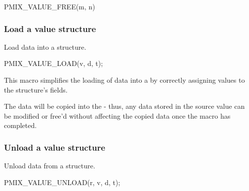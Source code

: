 \cspecificstart
\begin{codepar}
PMIX_VALUE_FREE(m, n)
\end{codepar}
\cspecificend

\begin{arglist}
\end{arglist}

\subsubsection{Load a value structure}

\summary

Load data into a  structure.

\cspecificstart
\begin{codepar}
PMIX_VALUE_LOAD(v, d, t);
\end{codepar}
\cspecificend

\begin{arglist}
\end{arglist}

\descr

This macro simplifies the loading of data into a  by correctly assigning values to the structure's fields.

\adviceuserstart
The data will be copied into the  - thus, any data stored in the source value can be modified or free'd without affecting the copied data once the macro has completed.
\adviceuserend

\subsubsection{Unload a value structure}

\summary

Unload data from a  structure.

\cspecificstart
\begin{codepar}
PMIX_VALUE_UNLOAD(r, v, d, t);
\end{codepar}
\cspecificend

